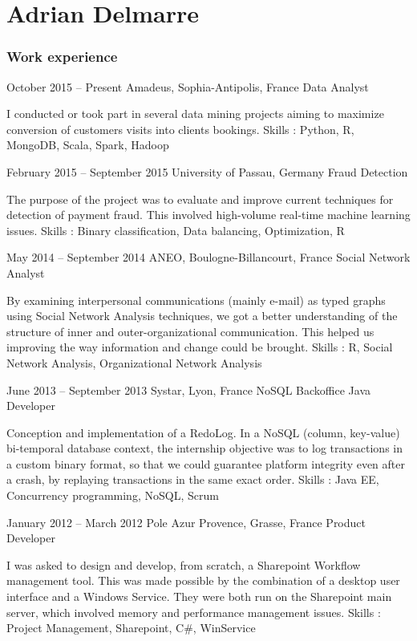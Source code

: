 \documentclass{tccv}
\begin{document}
\part{Adrian Delmarre}

\section{Work experience}

\begin{eventlist}


\item{October 2015 -- Present}
    {Amadeus, Sophia-Antipolis, France}
    {Data Analyst}

I conducted or took part in several data mining projects aiming to maximize conversion of customers visits into clients bookings.
Skills : Python, R, MongoDB, Scala, Spark, Hadoop

\item{February 2015 -- September 2015}
     {University of Passau, Germany}
     {Fraud Detection}

The purpose of the project was to evaluate and improve current techniques for detection of payment fraud. This involved high-volume real-time machine learning issues.
Skills : Binary classification, Data balancing, Optimization, R

\item{May 2014 -- September 2014}
     {ANEO, Boulogne-Billancourt, France}
     {Social Network Analyst}

By examining interpersonal communications (mainly e-mail) as typed graphs using Social Network Analysis techniques, we got a better understanding of the structure of inner and outer-organizational communication. This helped us improving the way information and change could be brought.
Skills : R, Social Network Analysis, Organizational Network Analysis

\item{June 2013 -- September 2013}
     {Systar, Lyon, France}
     {NoSQL Backoffice Java Developer}

Conception and implementation of a RedoLog.
In a NoSQL (column, key-value) bi-temporal database context, the internship objective was to log transactions in a custom binary format, so that we could guarantee platform integrity even after a crash, by replaying transactions in the same exact order.
Skills : Java EE, Concurrency programming, NoSQL, Scrum

\item{January 2012 -- March 2012}
     {Pole Azur Provence, Grasse, France}
     {Product Developer}

I was asked to design and develop, from scratch, a Sharepoint Workflow management tool. This was made possible by the combination of a desktop user interface and a Windows Service. They were both run on the Sharepoint main server, which involved memory and performance management issues.
Skills : Project Management, Sharepoint, C\#, WinService

\end{eventlist}
\end{document}
